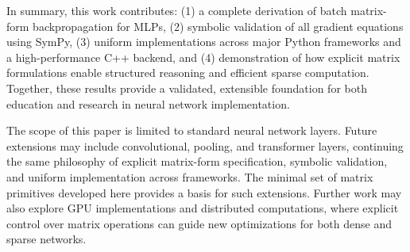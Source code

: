 \documentclass[twoside,11pt]{article}
\begin{document}
In summary, this work contributes:
(1) a complete derivation of batch matrix-form backpropagation for MLPs,
(2) symbolic validation of all gradient equations using SymPy,
(3) uniform implementations across major Python frameworks and a high-performance C++ backend, and (4) demonstration of how explicit matrix formulations enable structured reasoning and efficient sparse computation. Together, these results provide a validated, extensible foundation for both education and research in neural network implementation.

The scope of this paper is limited to standard neural network layers.
Future extensions may include convolutional, pooling, and transformer layers,
continuing the same philosophy of explicit matrix-form specification, symbolic validation, and uniform implementation across frameworks.
The minimal set of matrix primitives developed here provides a basis for such extensions. Further work may also explore GPU implementations and distributed computations, where explicit control over matrix operations can guide new optimizations for both dense and sparse networks.


\clearpage

\appendix
\end{document}
